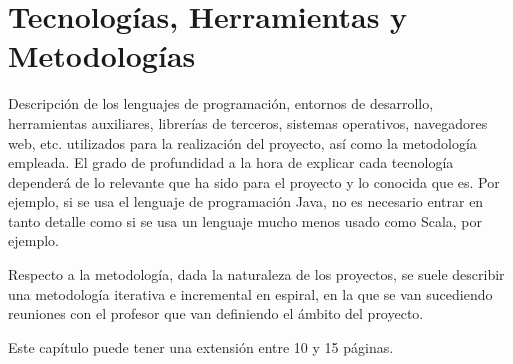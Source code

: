 \cleardoublepage
\chapter{Tecnologías, Herramientas y Metodologías}

Descripción de los lenguajes de programación, entornos de desarrollo, herramientas auxiliares, librerías de terceros, sistemas operativos, navegadores web, etc. utilizados para la realización del proyecto, así como la metodología empleada. El grado de profundidad a la hora de explicar cada tecnología dependerá de lo relevante que ha sido para el proyecto y lo conocida que es. Por ejemplo, si se usa el lenguaje de programación Java, no es necesario entrar en tanto detalle como si se usa un lenguaje mucho menos usado como Scala, por ejemplo.

Respecto a la metodología, dada la naturaleza de los proyectos, se suele describir una metodología iterativa e incremental en espiral, en la que se van sucediendo reuniones con el profesor que van definiendo el ámbito del proyecto.

Este capítulo puede tener una extensión entre 10 y 15 páginas.

